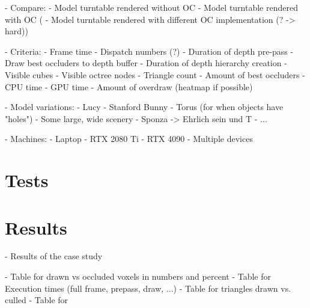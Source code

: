 - Compare:
    - Model turntable rendered without OC
    - Model turntable rendered with OC
(   - Model turntable rendered with different OC implementation (? -> hard))


- Criteria: 
    - Frame time
    - Dispatch numbers (?)
    - Duration of depth pre-pass
        - Draw best occluders to depth buffer
        - Duration of depth hierarchy creation
    - Visible cubes
    - Visible octree nodes
    - Triangle count
    - Amount of best occluders
    - CPU time
    - GPU time
    - Amount of overdraw (heatmap if possible)


- Model variations:
    - Lucy
    - Stanford Bunny
    - Torus (for when objects have "holes")
    - Some large, wide scenery
    - Sponza        -> Ehrlich sein und T
    - ...


- Machines:
    - Laptop
    - RTX 2080 Ti
    - RTX 4090
    - Multiple devices


\section{Tests}






\section{Results}

- Results of the case study

- Table for drawn vs occluded voxels in numbers and percent
- Table for Execution times (full frame, prepass, draw, ...)
- Table for triangles drawn vs. culled 
- Table for 
